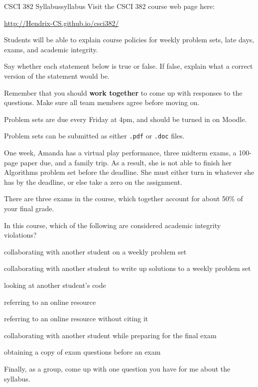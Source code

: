 \documentclass{tufte-handout}
\begin{document}
\newpage
\begin{model*}{CSCI 382 Syllabus}{syllabus}
  Visit the CSCI 382 course web page here: \bigskip

  \url{http://Hendrix-CS.github.io/csci382/}
\end{model*}

\begin{objective}
  Students will be able to explain course policies for weekly problem
  sets, late days, exams, and academic integrity.
\end{objective}

Say whether each statement below is true or false.  If false, explain
what a correct version of the statement would be.

Remember that you should \textbf{work together} to come up with
responses to the questions.  Make sure all team members agree before
moving on.

\begin{questions}

  \item Problem sets are due every Friday at 4pm, and should be turned
    in on Moodle.

  \item Problem sets can be submitted as either \texttt{.pdf} or
    \texttt{.doc} files.

  \item One week, Amanda has a virtual play performance, three midterm
    exams, a 100-page paper due, and a family trip.  As a result, she
    is not able to finish her Algorithms problem set before the
    deadline.  She must either turn in whatever she has by the
    deadline, or else take a zero on the assignment.
  \item There are three exams in the course, which together account
    for about 50\% of your final grade.
  \item In this course, which of the following are considered academic
    integrity violations? 
    \begin{compactenum}[(a)]
      \item collaborating with another student on a weekly problem set
      \item collaborating with another student to write up solutions
        to a weekly problem set
      \item looking at another student's code
      \item referring to an online resource
      \item referring to an online resource without citing it
      \item collaborating with another student while preparing for the
        final exam
      \item obtaining a copy of exam questions before an exam
      \end{compactenum} \bigskip

    \item Finally, as a group, come up with one question you have for me about
      the syllabus.
\end{questions}
\end{document}
